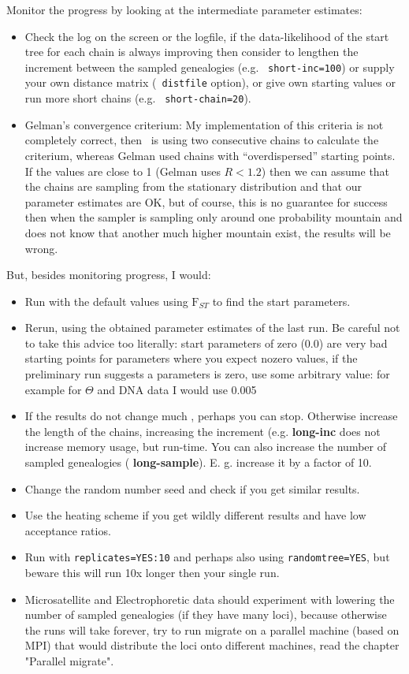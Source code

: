 Monitor the progress by looking at the intermediate parameter estimates:
\begin{itemize}
\item Check the log on the screen or the logfile, if the data-likelihood of 
the start tree for each chain is always improving then consider to lengthen 
the increment between the sampled genealogies (e.g. \texttt{ short-inc=100}) or
supply 
your own distance matrix (\texttt{ distfile} option), or give own starting 
values or run more short chains (e.g. \texttt{ short-chain=20}).
\item Gelman's convergence criterium: My implementation of this criteria
is not completely correct, then \migrate\ is using two consecutive chains
to calculate the criterium, whereas Gelman used chains with ``overdispersed'' 
starting points. If the values are close to 1 (Gelman uses $R < 1.2$) then 
we can assume that the chains are sampling from the stationary distribution 
and that our parameter estimates are OK, but of course, this is no guarantee
for success then when the sampler is sampling only around one probability mountain and
does not know that another much higher mountain exist, the results will be wrong.
\end{itemize}  
But, besides monitoring progress, I would:
\begin{itemize}
\item Run \migrate with the default values using ${\mathrm F_{ST}}$ to find
the start parameters.
\item Rerun, using the obtained parameter estimates of the last run. Be careful not to take this advice too literally: start parameters of zero (0.0) are very bad starting points for parameters where you expect nozero values, if the preliminary run suggests a parameters is zero, use some arbitrary value: for example for $\Theta$ and DNA data I would use 0.005 
\item If the results do not change much , perhaps you can stop. Otherwise
increase the length of the chains, increasing the increment 
(e.g. \textbf{ long-inc} does not
increase memory usage, but run-time. 
You can also increase the number of sampled
genealogies (\textbf{ long-sample}).
E. g. increase it by a factor of 10.
\item Change the random number seed and check if you get similar results.
\item Use the heating scheme if you get wildly different results and
have low acceptance ratios.
\item Run with \texttt{replicates=YES:10} and perhaps also using
\texttt{randomtree=YES}, but beware this will run 10x longer then your single
run.
\item Microsatellite and Electrophoretic data should experiment with
lowering the number of sampled genealogies (if they have many loci), because
otherwise the runs will take forever, try to run migrate on a parallel machine 
(based on MPI) that would distribute the loci
onto different machines, read the chapter "Parallel migrate".
\end{itemize}

